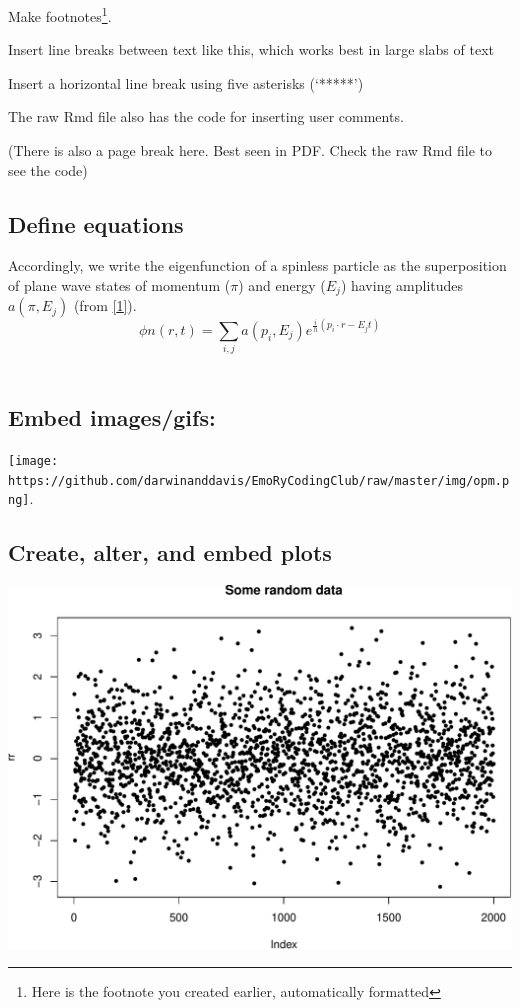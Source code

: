 \documentclass[article]{article}
\begin{document}
Make footnotes\footnote{Here is the footnote you created earlier,
  automatically formatted}.

Insert line breaks between text like this, which works best in large
slabs of text

Insert a horizontal line break using five asterisks (`*****')

The raw Rmd file also has the code for inserting user comments.

(There is also a page break here. Best seen in PDF. Check the raw Rmd
file to see the code)

\newpage

\subsection{Define equations}\label{define-equations}

Accordingly, we write the eigenfunction of a spinless particle as the
superposition of plane wave states of momentum (\(\pi\)) and energy
(\(E_{j}\)) having amplitudes \(a(\pi,E_{j})\) (from
\href{https://arxiv.org/vc/quant-ph/papers/0607/0607001v1.pdf}{{[}1{]}}).
\[
\phi n(r,t) =
  \sum_{i, j} a(p_{i},E_{j})
  e^{
    \frac{i}
    {h}
    (p_{i} \cdot r - E_{j}t)
}
\] ~

\subsection{Embed images/gifs:}\label{embed-imagesgifs}

\texttt{[image: https://github.com/darwinanddavis/EmoRyCodingClub/raw/master/img/opm.png]}.

\newpage

\subsection{Create, alter, and embed
plots}\label{create-alter-and-embed-plots}

\includegraphics{Lesson5_rmd_files/figure-latex/unnamed-chunk-2-1.pdf}
\end{document}
